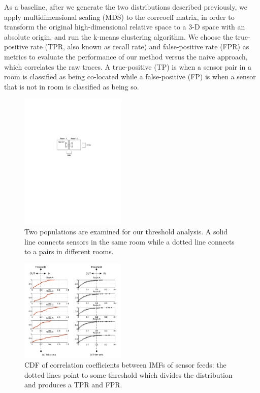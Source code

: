 As a baseline, after we generate the two distributions described previously, we apply multidimensional scaling (MDS) to the corrcoeff matrix, in order to transform the original high-dimensional relative space to a 3-D space with an absolute origin, and run the k-means clustering algorithm.
We choose the true-positive rate (TPR, also known as recall rate) and false-positive rate (FPR) as metrics to evaluate the performance of our method versus the naive approach, which correlates the raw traces. A true-positive (TP) is when a sensor pair in a room is classified as being co-located 
while a false-positive (FP) is when a sensor that is not in room is classified as being so.

\begin{figure}[h!]
\centering
	\includegraphics[width=0.45\textwidth]{figs/Inter_intra_relationships}
\caption{Two populations are examined for our threshold analysis.  A solid line connects sensors in the same room while a dotted line connects
 to a pairs in different rooms.}
\label{fig:group}
\end{figure}

\begin{figure}[h!]
\centering
	\includegraphics[width=0.45\textwidth]{figs/corrcoeff_cdf_in_out}
\caption{CDF of correlation coefficients between IMFs of sensor feeds: the dotted lines point to some threshold which divides
 the distribution and produces a TPR and FPR.
}
\label{fig:cdf}
\end{figure}

